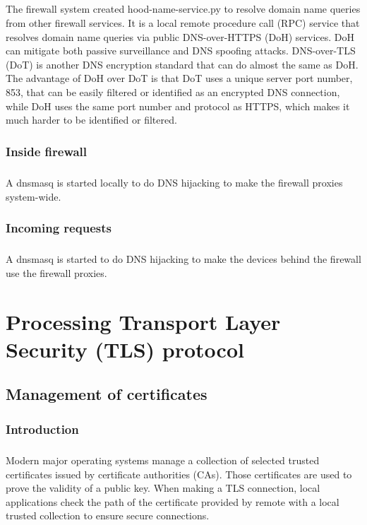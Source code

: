 \documentclass[mscthesis]{usiinfthesis}
\begin{document}
\paragraph{}
The firewall system created hood-name-service.py to resolve domain name queries from other firewall services. It is a local remote procedure call (RPC) service that resolves domain name queries via public DNS-over-HTTPS (DoH) services. DoH can mitigate both passive surveillance and DNS spoofing attacks\citep{rfc:doh8}. DNS-over-TLS (DoT) is another DNS encryption standard that can do almost the same as DoH. The advantage of DoH over DoT is that DoT uses a unique server port number, 853, that can be easily filtered or identified as an encrypted DNS connection, while DoH uses the same port number and protocol as HTTPS, which makes it much harder to be identified or filtered.
\subsection{Inside firewall}
\paragraph{}
A dnsmasq is started locally to do DNS hijacking to make the firewall proxies system-wide.
\subsection{Incoming requests}
\paragraph{}
A dnsmasq is started to do DNS hijacking to make the devices behind the firewall use the firewall proxies.

\chapter{Processing Transport Layer Security (TLS) protocol}\label{cha:tls}

\section{Management of certificates}

\subsection{Introduction}
\paragraph{}
Modern major operating systems manage a collection of selected trusted certificates issued by certificate authorities (CAs). Those certificates are used to prove the validity of a public key. When making a TLS connection, local applications check the path of the certificate provided by remote with a local trusted collection to ensure secure connections.
\end{document}
